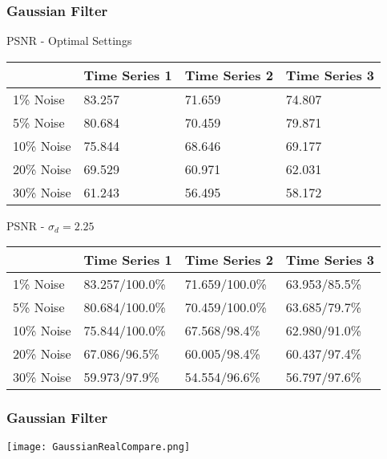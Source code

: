 \documentclass{beamer}
\begin{document}

\begin{frame}
\begin{center}
\frametitle{Gaussian Filter}

\small{

PSNR - Optimal Settings

\begin{table}[h]
\begin{tabular}{l | l | l | l}
 & Time Series 1 & Time Series 2 & Time Series 3 \\ \hline
1\% Noise & 83.257 & 71.659 & 74.807 \\ \hline
5\% Noise & 80.684 & 70.459 & 79.871 \\ \hline
10\% Noise & 75.844 & 68.646 & 69.177 \\ \hline
20\% Noise & 69.529 & 60.971 & 62.031 \\ \hline
30\% Noise & 61.243 & 56.495 & 58.172
\end{tabular}
\end{table}

PSNR - $\sigma_d = 2.25$

\begin{table}[h]
\begin{tabular}{l | l | l | l}
 & Time Series 1 & Time Series 2 & Time Series 3 \\ \hline
1\% Noise & 83.257/100.0\% & 71.659/100.0\% & 63.953/85.5\% \\ \hline
5\% Noise & 80.684/100.0\% & 70.459/100.0\% & 63.685/79.7\% \\ \hline
10\% Noise & 75.844/100.0\% & 67.568/98.4\% & 62.980/91.0\% \\ \hline
20\% Noise & 67.086/96.5\% & 60.005/98.4\% & 60.437/97.4\% \\ \hline
30\% Noise & 59.973/97.9\% & 54.554/96.6\% & 56.797/97.6\%
\end{tabular}
\end{table}

}

\end{center}
\end{frame}


\begin{frame}
\begin{center}
\frametitle{Gaussian Filter}

\texttt{[image: GaussianRealCompare.png]}

\end{center}
\end{frame}
\end{document}
